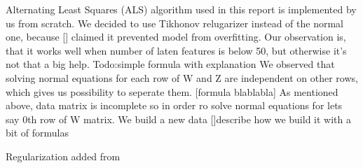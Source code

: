 Alternating Least Squares (ALS) algorithm used in this report is implemented by us from scratch. We decided to use Tikhonov relugarizer instead of the normal one, because [] claimed it prevented model from overfitting. Our observation is, that it works well when number of laten features is below 50, but otherwise it's not that a big help. Todo:simple formula with explanation
We observed that solving normal equations for each row of W and Z are independent on other rows, which gives us possibility to seperate them.
[formula blablabla]
As mentioned above, data matrix is incomplete so in order ro solve normal equations for lets say 0th row of W matrix. We build a new data 
[]describe how we build it with a bit of formulas


Regularization added from \cite{Zhou2008}

